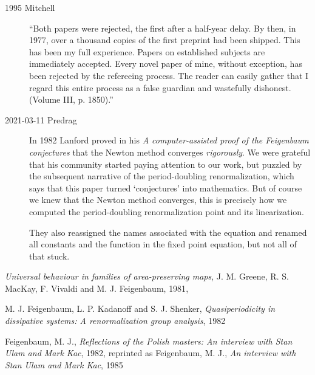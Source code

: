 \begin{description}
  \item[1995 Mitchell]
``Both papers were rejected, the first after a
half-year delay. By then, in 1977, over a thousand  copies  of  the
first  preprint  had  been shipped.  This  has  been  my  full
experience. Papers on established subjects are immediately accepted.
Every novel paper of mine, without exception, has been rejected by the
refereeing process. The reader  can easily  gather  that  I  regard  this
entire  process  as  a  false guardian  and  wastefully dishonest.
(Volume III, p. 1850).''

  \item[2021-03-11 Predrag]
In {1982} {Lanford} proved in his {\em A computer-assisted
proof of the {Feigenbaum} conjectures} that the Newton method converges
\emph{rigorously}. We were grateful that his community started paying
attention to our work, but puzzled by the subsequent narrative of the
period-doubling renormalization, which says that this paper turned
`conjectures' into mathematics. But of course we knew that the Newton
method converges, this is precisely how we computed the period-doubling
renormalization point and its linearization.

They also reassigned the names associated with the equation
and renamed all constants and the function in the fixed point equation,
but not all of that stuck.

\end{description}

{\em Universal behaviour in families of area-preserving maps},
{J. M. Greene, R. S. MacKay, F. Vivaldi and M. J. Feigenbaum},
{1981},

{M. J. Feigenbaum, L. P. Kadanoff and S. J. Shenker},
  {\em Quasiperiodicity in dissipative systems: {A} renormalization group analysis},
{1982}

{Feigenbaum, M. J.},
{\em Reflections of the {Polish} masters: {An} interview with {Stan Ulam} and {Mark Kac}},
{1982},
reprinted as
{Feigenbaum, M. J.},
  {\em An interview with {Stan Ulam} and {Mark Kac}},
  {1985}

